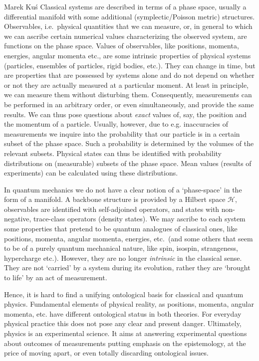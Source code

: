 \begin{artengenv}{Marek Ku\'s}
Classical systems are described in terms of a phase space, usually a differential manifold with some additional (symplectic/Poisson metric) structures. Observables, i.e.\ physical quantities that we can measure, or, in general to which we can ascribe certain numerical values characterizing the observed system, are functions on the phase space.
Values of observables, like positions, momenta, energies, angular momenta etc., are some intrinsic properties of physical systems (particles, ensembles of particles, rigid bodies, etc.). They can change in time, but are properties that are possessed by systems alone and do not depend on whether or not they are actually measured at a particular moment. At least in principle, we can measure them without disturbing them. Consequently, measurements can be performed in an arbitrary order, or even simultaneously, and provide the same results. We can thus pose questions about \textit{exact} values of, say, the position and the momentum of a particle. Usually, however, due to e.g. inaccuracies of measurements we inquire into the probability  that our particle is in a certain subset of the phase space. Such a probability is determined by the volumes of the relevant subsets. Physical states can thus be identified with probability distributions on (measurable) subsets of the phase space. Mean values (results of experiments) can be calculated using these distributions.


In quantum mechanics we do not have a clear notion of a `phase-space' in the form of a manifold. A backbone structure is provided by a Hilbert space $ \mathcal{H} $, observables are identified with self-adjoined operators, and states with non-negative, trace-class operators (density states). We may ascribe to each system some properties that pretend to be quantum analogues of classical ones, like positions, momenta, angular momenta, energies, etc.\ (and some others that seem to be of a purely quantum mechanical nature, like spin, isospin, strangeness, hypercharge etc.). However, they are no longer \textit{intrinsic} in the classical sense. They are not `carried' by a system during its evolution, rather they are `brought to life' by an act of measurement.
         
         
Hence, it is hard to find a unifying ontological basis for classical and quantum physics. Fundamental elements of physical reality, as positions, momenta, angular momenta, etc. have different ontological status in both theories. For everyday physical practice this does not pose any clear and present danger. Ultimately, physics is an experimental science. It aims at answering experimental questions about outcomes of measurements putting emphasis on the epistemology, at the price of moving apart, or even totally discarding ontological issues.  
         

\end{artengenv}
